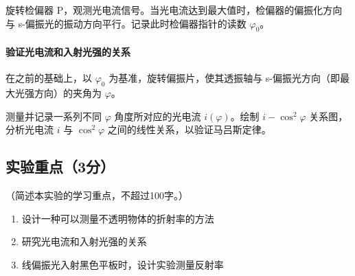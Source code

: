 \documentclass[]{../../templates/Report}%
\begin{document}
    旋转检偏器 P，观测光电流信号。当光电流达到最大值时，检偏器的偏振化方向与 s-偏振光的振动方向平行。记录此时检偏器指针的读数 $\varphi_0$。
    \paragraph{验证光电流和入射光强的关系}
    在之前的基础上，以 $\varphi_0$ 为基准，旋转偏振片，使其透振轴与 s-偏振光方向（即最大光强方向）的夹角为 $\varphi$。

    测量并记录一系列不同 $\varphi$ 角度所对应的光电流 $i(\varphi)$。绘制 $i - \cos^2 \varphi$ 关系图，分析光电流 $i$ 与 $\cos^2 \varphi$ 之间的线性关系，以验证马吕斯定律。
\subsection{实验重点（3分）}
（简述本实验的学习重点，不超过100字。）
\begin{enumerate}
    \item 设计一种可以测量不透明物体的折射率的方法
    \item 研究光电流和入射光强的关系
    \item 线偏振光入射黑色平板时，设计实验测量反射率
\end{enumerate}
\end{document}
